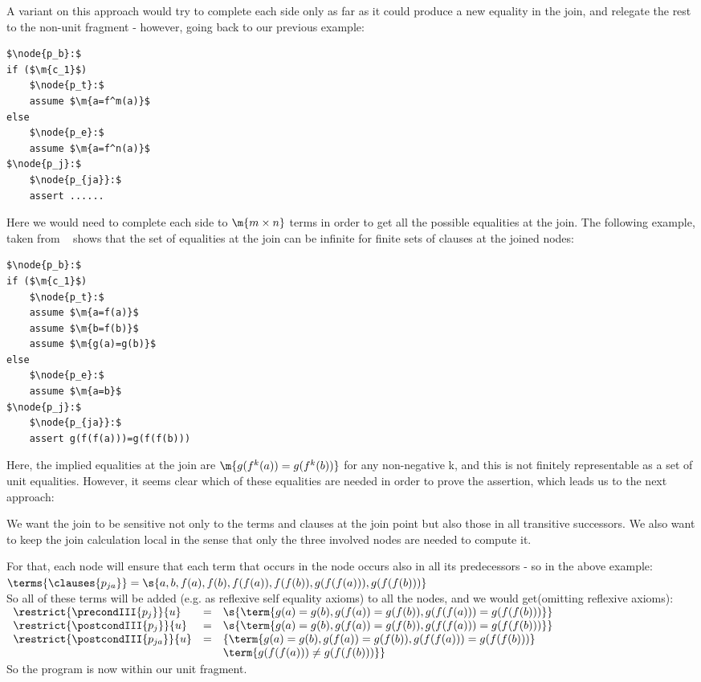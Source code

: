 A variant on this approach would try to complete each side only as far as it could produce a new equality in the join, 
and relegate the rest to the non-unit fragment - however, going back to our previous example:
\begin{lstlisting}[caption=join congruence closure quadratic depth simple,label=snippet3.21]
$\node{p_b}:$
if ($\m{c_1}$)
	$\node{p_t}:$
	assume $\m{a=f^m(a)}$
else
	$\node{p_e}:$
	assume $\m{a=f^n(a)}$
$\node{p_j}:$
	$\node{p_{ja}}:$
	assert ......
\end{lstlisting}

Here we would need to complete each side to $\m{m \times n}$ terms in order to get all the possible equalities at the join.
The following example, taken from ~\cite{GulwaniTiwariNecula04} shows that the set of equalities at the join can be infinite for finite sets of clauses at the joined nodes:
\begin{lstlisting}[caption=join congruence closure infinite,label=snippet3.22]
$\node{p_b}:$
if ($\m{c_1}$)
	$\node{p_t}:$
	assume $\m{a=f(a)}$
	assume $\m{b=f(b)}$
	assume $\m{g(a)=g(b)}$
else
	$\node{p_e}:$
	assume $\m{a=b}$
$\node{p_j}:$
	$\node{p_{ja}}:$
	assert g(f(f(a)))=g(f(f(b)))
\end{lstlisting}

Here, the implied equalities at the join are $\m{g(f^k(a))=g(f^k(b))}$ for any non-negative k, and this is not finitely representable as a set of unit equalities. However, it seems clear which of these equalities are needed in order to prove the assertion, which leads us to the next approach:

We want the join to be sensitive not only to the terms and clauses at the join point but also those in all transitive successors.
We also want to keep the join calculation local in the sense that only the three involved nodes are needed to compute it.

For that, each node will ensure that each term that occurs in the node occurs also in all its predecessors - 
so in the above example:\\
$\terms{\clauses{p_{ja}}} = \s{a,b,f(a),f(b),f(f(a)),f(f(b)),g(f(f(a))),g(f(f(b)))}$\\
So all of these terms will be added (e.g. as reflexive self equality axioms) to all the nodes, and we would get(omitting reflexive axioms):\\
$
\begin{array}{lll}
	\restrict{\precondIII{p_j}}{u}     & = & \s{\term{g(a)=g(b),g(f(a))=g(f(b)),g(f(f(a)))=g(f(f(b)))}} \\
	\restrict{\postcondIII{p_j}}{u}    & = & \s{\term{g(a)=g(b),g(f(a))=g(f(b)),g(f(f(a)))=g(f(f(b)))}} \\
	\restrict{\postcondIII{p_{ja}}}{u} & = & \{\term{g(a)=g(b),g(f(a))=g(f(b)),g(f(f(a)))=g(f(f(b)))} \\
	                                   &   & \term{g(f(f(a))) \neq g(f(f(b)))}\} \\
\end{array}
$\\
So the program is now within our unit fragment.

